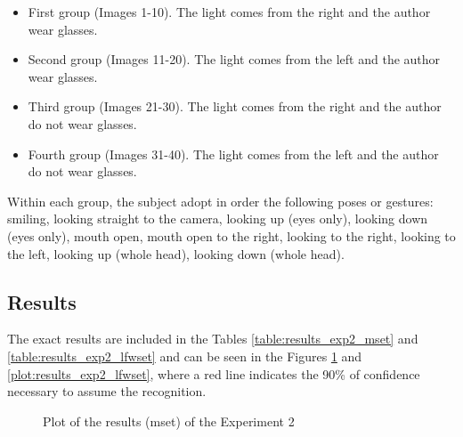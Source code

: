 	\begin{itemize}
		\item First group (Images 1-10). The light comes from the right and the author wear glasses.
		\item Second group (Images 11-20). The light comes from the left and the author wear glasses.
		\item Third group (Images 21-30). The light comes from the right and the author do not wear glasses.
		\item Fourth group (Images 31-40). The light comes from the left and the author do not wear glasses.
	\end{itemize}

	Within each group, the subject adopt in order the following poses or gestures: smiling, looking straight to the camera, looking up (eyes only), looking down (eyes only), mouth open, mouth open to the right, looking to the right, looking to the left, looking up (whole head), looking down (whole head).

	\subsection{Results}
	The exact results are included in the Tables \ref{table:results_exp2_mset} and \ref{table:results_exp2_lfwset} and can be seen in the Figures \ref{plot:results_exp2_mset} and \ref{plot:results_exp2_lfwset}, where a red line indicates the 90\% of confidence necessary to assume the recognition.

	\begin{figure}[p]
		\centering
		\resizebox{\textwidth}{!}
		{		
		}
		\caption{Plot of the results (\gls{mset}) of the Experiment 2}
		\label{plot:results_exp2_mset}
	\end{figure}

